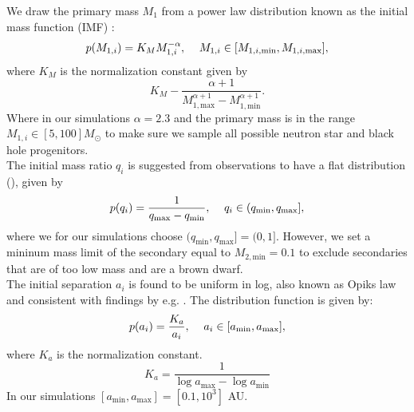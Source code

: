 \documentclass[a4paper,fleqn,usenatbib]{mnras}
\begin{document}

We draw the primary mass $M_1$ from a power law distribution known as the initial mass function (IMF)   \citep{kroupa2001variation}:  
%
\begin{equation}
    p(M_{1,i}) = K_M M_{1,i}^{-\alpha}, \hspace{0.3cm} \ M_{1,i} \in [M_{1,i, \text{min}} , M_{1,i, \text{max}} ], 
\label{eq:prior-IMF}
\end{equation} 
%
where  $K_M$ is the normalization constant given by
%
\begin{equation*}
	K_M - \frac{\alpha + 1}{M_{1, \text{max}}^{\alpha +1 } -  M_{1, \text{min}}^{\alpha +1 }}. 
\end{equation*}
%
Where in our simulations $\alpha = 2.3$ and the primary mass is in the range $M_{1,i} \in [5,100] M_{\odot}$ to make sure we sample all possible neutron star and black hole progenitors.  \\
%
%
%

The initial mass ratio $q_i$ is suggested from observations to have a flat distribution (\citealt{mazeh1992mass, goldberg1994mass, tout1991relation, sana2012binary}),  given by
%
\begin{equation}
    p(q_i) =  \frac{1}{q_{ \text{max}} - q_{ \text{min}}}, \hspace{0.3cm} \ q_i \in (q_{ \text{min}}, q_{ \text{max}}],  
	\label{eq:prior-massratio}
\end{equation}
%
where we for our simulations choose $ (q_{ \text{min}}, q_{ \text{max}}] = (0 ,1]$. 
However, we set a mininum mass limit of the secondary equal to $ M_{2,\text{min}} = 0.1$ to exclude secondaries that are of too low mass and are a brown dwarf. \\
%

The initial separation $a_i$ is found to be uniform in log, also known as Opiks law \citep{opik1924statistical} and consistent with findings by e.g. \citet{kobulnicky2014toward, moe2015early}.  The distribution function is given by:
%
\begin{equation}
    p(a_i) = \frac{K_a }{a_i},  \hspace{0.3cm} \ a_i \in [a_{\text{min}} , a_{\text{max}} ],
	\label{eq:prior-separation}
\end{equation} 
%
where $K_a$ is the normalization constant.
%
\begin{equation*}
	K_a = \frac{1}{\log a_{\text{max}}- \log a_{\text{min}}} 	
\end{equation*}
%
In our simulations $[a_{\text{min}} , a_{\text{max}} ] =  [0.1,10^3]$  AU. 
\end{document}
